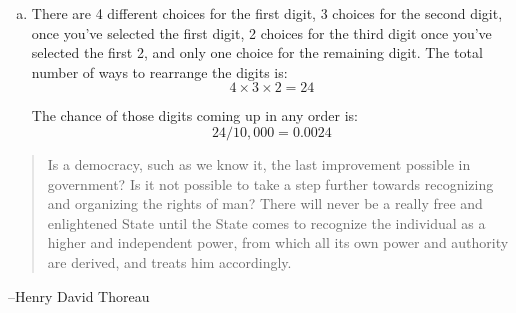 \documentclass[letterpaper, landscape]{exam}
\begin{document}
\begin{description}
\begin{enumerate}[(a)]
            \item There are 4 different choices for the first digit, 3 choices
              for the second digit, once you've selected the first digit, 2
              choices for the third digit once you've selected the first 2, and
              only one choice for the remaining digit. The total number of ways
              to rearrange the digits is:
              \[
                4 \times 3 \times 2 = 24
              \]

              The chance of those digits coming up in any order is:
              \[
                24 / 10,000 = \boxed{ 0.0024 }
              \]
          \end{enumerate}

  \end{description}

  \else
    \vspace{10 cm}
    \begin{quote}
      \begin{em}
        Is a democracy, such as we know it, the last improvement possible in
        government? Is it not possible to take a step further towards
        recognizing and organizing the rights of man? There will never be a
        really free and enlightened State until the State comes to recognize the
        individual as a higher and independent power, from which all its own
        power and authority are derived, and treats him accordingly. 
      \end{em}
    \end{quote}
    \hspace{1 cm} --Henry David Thoreau
  \fi
\end{document}
